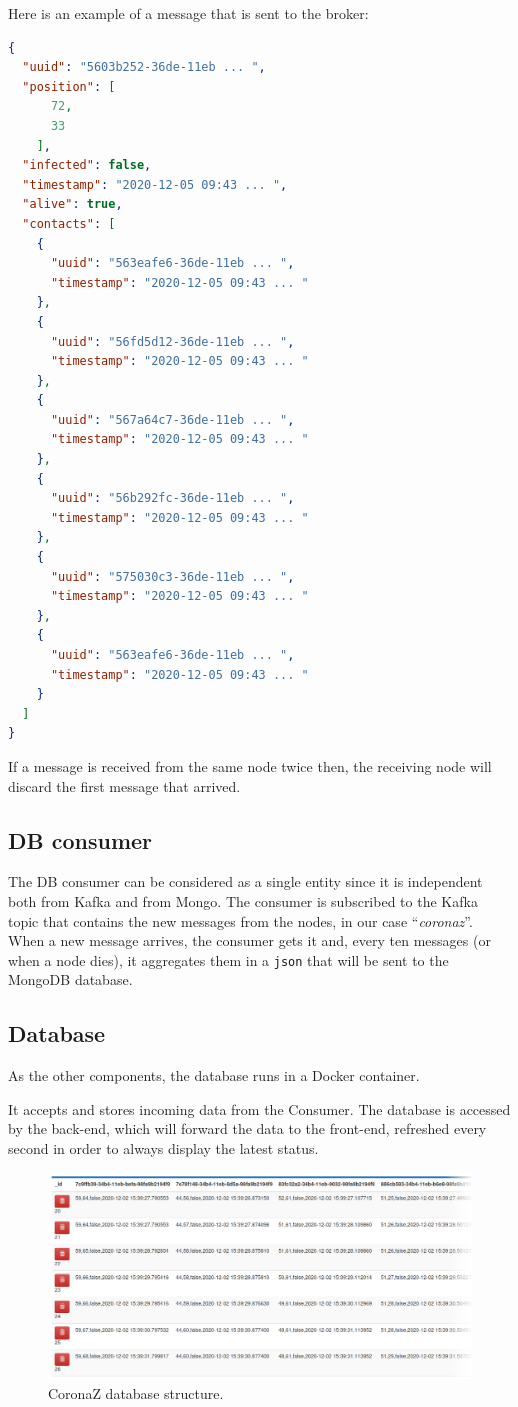 \documentclass[conference]{IEEEtran}
\begin{document}
		Here is an example of a message that is sent to the broker:
		\begin{lstlisting}[language=json]
{
  "uuid": "5603b252-36de-11eb ... ",
  "position": [
      72,
      33
    ],
  "infected": false,
  "timestamp": "2020-12-05 09:43 ... ",
  "alive": true,
  "contacts": [
    {
      "uuid": "563eafe6-36de-11eb ... ",
      "timestamp": "2020-12-05 09:43 ... "
    },
    {
      "uuid": "56fd5d12-36de-11eb ... ",
      "timestamp": "2020-12-05 09:43 ... "
    },
    {
      "uuid": "567a64c7-36de-11eb ... ",
      "timestamp": "2020-12-05 09:43 ... "
    },
    {
      "uuid": "56b292fc-36de-11eb ... ",
      "timestamp": "2020-12-05 09:43 ... "
    },
    {
      "uuid": "575030c3-36de-11eb ... ",
      "timestamp": "2020-12-05 09:43 ... "
    },
    {
      "uuid": "563eafe6-36de-11eb ... ",
      "timestamp": "2020-12-05 09:43 ... "
    }
  ]
}
		\end{lstlisting}
		
		If a message is received from the same node twice then, the receiving node will discard the first message that arrived.
	
	\subsection{DB consumer}
	
		The DB consumer can be considered as a single entity since it is independent both from Kafka and from Mongo.
		The consumer is subscribed to the Kafka topic that contains the new messages from the nodes, in our case ``\textit{coronaz}''.
		When a new message arrives, the consumer gets it and, every ten messages (or when a node dies), it aggregates them in a \texttt{json} that will be sent to the MongoDB database.
	
	\subsection{Database}
	
		As the other components, the database runs in a Docker container.
		
		It accepts and stores incoming data from the Consumer.
		The database is accessed by the back-end, which will forward the data to the front-end, refreshed every second in order to always display the latest status.
	
		\begin{figure}[htbp]
			\centerline{\includegraphics[width=\linewidth]{img/database.png}}
			\caption{CoronaZ database structure.}
			\label{fig:database}
		\end{figure}
	
\end{document}
